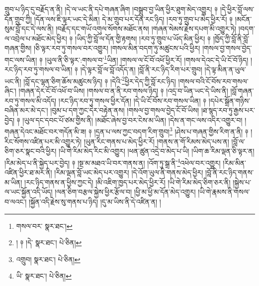 གྲུབ་པ་ཉིད་དུ་བརྗོད་ན་ནི། །དེ་ལ་ཡང་ནི་དཔེ་གཞན་ཞིག །བསྒྲུབ་བྱ་ཡིན་ཕྱིར་ཐུག་མེད་འགྱུར། ༈ །དེ་ཕྱིར་བློ་ལས་དོན་གྲུབ་ཀྱི། །དོན་ལས་ཇི་ལྟར་ཡང་དེ་མིན། དེ་མ་གྲུབ་པར་དོན་རང་ཉིད། །རབ་ཏུ་གྲུབ་པ་མེད་ཕྱིར་རོ། ༈ །མངོན་སུམ་བློ་དང་དེ་ལས་ནི། །བརྗོད་དང་གཡོ་འགུལ་སོགས་མཐོང་ནས། །གཞན་སེམས་རྗེས་དཔག་མི་འགྱུར་ཏེ། །བདག་ལ་འབྲེལ་པ་མཐོང་མེད་ཕྱིར། ༈ །ཡིད་ཀྱི་བློ་ལ་དོན་གྱི་རྟགས། །རབ་ཏུ་གྲུབ་པ་ཡོད་མིན་ཕྱིར། ༈ །ཁྱོད་ཀྱི་བློ་ནི་བློ་གཞན་གྱིས། །ཅི་ལྟར་རབ་ཏུ་གསལ་བར་འགྱུར། །གསལ་མིན་བདག་ཏུ་མཚུངས་པའི་ཕྱིར། །གསལ་བྱ་གསལ་བྱེད་གང་ལས་ཡིན། ༈ །ཡུལ་ནི་ཅི་ལྟར་:གསལ་བ་\footnote{གསལ་བར་  སྣར་ཐང་། }ཡིན། །གསལ་ལ་ངོ་བོ་འཕོ་ཕྱིར་རོ། །གསལ་དེའང་དེ་ཡི་ངོ་བོ་ཉིད། །རང་ཉིད་རབ་ཏུ་གསལ་བ་ཡིན། ༈ །དེ་ལྟར་བློ་ལ་བློ་འདོད་ན། །བློ་ནི་རང་ཉིད་རིག་པར་གྲུབ། །དེ་ལྟ་མིན་ན་ཡུལ་ཡང་ནི། །བློ་དང་ལྷན་ཅིག་ཆོས་མཚུངས་ཉིད། ༈ །དེའི་\footnote{། ༈ །དེ་  སྣར་ཐང་།  པེ་ཅིན། }ཕྱིར་དེད་ཀྱི་བློ་རང་ཉིད། །གསལ་བའི་ངོ་བོས་རབ་གསལ་ཞིང་། །གཞན་དེར་ངོ་བོ་འཕོ་བ་ཡིས། །གསལ་བ་ན་ནི་རབ་གསལ་ཉིད། ༈ །འདྲ་བ་ཡིན་ཡང་དེ་ཡིས་ནི། །བློ་གཞན་རབ་ཏུ་གསལ་མི་འདོད། །རང་ཉིད་རབ་ཏུ་གསལ་ཕྱིར་དོན། །དེ་ཡི་ངོ་བོས་རབ་གསལ་ཡིན། ༈ །དཔེར་སྒྲོན་གཉིས་བཞིན་མར་མེ་དང་། །བུམ་པ་དག་ཀྱང་དེར་བརྟེན་ནས། །གསལ་བྱ་གསལ་བྱེད་ངོ་བོ་ཡིས། །ཐ་སྙད་རབ་ཏུ་རྒྱས་པར་བྱེད། ༈ །ཡུལ་དང་དབང་པོ་ཙམ་གྱིས་ནི། །མཐོང་ཞེས་བྱ་བར་ངེས་མ་ཡིན། །དེས་ན་གང་ལས་འདིར་འགྱུར་བ། །གཞན་དེའང་མཐོང་བར་གདོན་མི་ཟ། ༈ །དྲན་པ་ལས་ཀྱང་བདག་རིག་གྲུབ།\footnote{འགྲུབ།  སྣར་ཐང་།  པེ་ཅིན། } །ཤེས་པ་གཞན་གྱིས་རིག་ན་ནི། ༈ །རིང་སོགས་འཛིན་པར་མི་འགྱུར་ཏེ། །ཡུན་རིང་གནས་པ་མེད་ཕྱིར་རོ། །གནས་ན་གོ་རིམས་མེད་པས་ན། །བློ་ལ་ཅིག་ཅར་སྣང་བའི་ཕྱིར། །ཡི་གེ་རིམ་མེད་རིང་མི་འགྱུར། །ཕན་ཚུན་འདྲེ་བ་མེད་པ་ཡི། །ཡིག་ཆ་རིམ་ལྡན་ཅི་ལྟར་ན། །རིམ་མེད་པ་ནི་སྐྱེད་པར་བྱེད། ༈ །སྔ་མ་མཐའ་ཡི་བར་གནས་ན། །འོག་ཏུ་སྒྲ་ནི་\footnote{ཡི་  སྣར་ཐང་།  པེ་ཅིན། }འཕེལ་བར་འགྱུར། །རིམ་མིན་འཛིན་ཕྱིར་ཐ་མར་ནི། །རིམ་ལྡན་བློ་ཡང་མེད་པར་འགྱུར། །དེ་འོག་ཡུལ་ནི་གནས་མེད་ཕྱིར། །བློ་ནི་རང་ཉིད་གནས་མ་ཡིན། །རང་ཉིད་གནས་ན་ཕྱིས་ཀྱང་དེ། །མི་འཇིག་ཁྱད་པར་མེད་ཕྱིར་རོ། །ཡི་གེ་རིམ་མེད་ཅིག་ཅར་ནི། །སྐྱེས་པ་ལ་ཡང་སྐྱོན་འདི་ཡོད། །ལན་ཅིག་བརྩལ་སྐྱེས་ཕྱིར་རྩོལ་བ། །ཕྱི་མ་ཕྱི་མ་དོན་མེད་འགྱུར། །ཡི་གེ་རྣམས་ནི་གསལ་བ་ལའང་། །སྐྱོན་འདི་རྗེས་སུ་གནས་པ་ཉིད། །དུ་མ་ཡིས་ནི་དེ་འཛིན་ན། །
